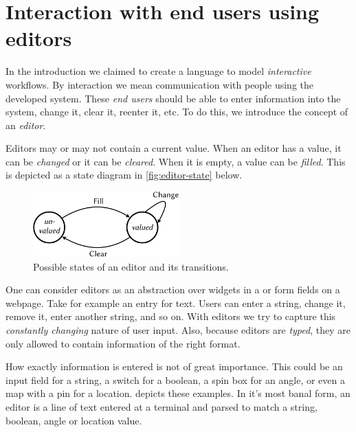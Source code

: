 
\section{Interaction with end users using editors}

In the introduction we claimed to create a language to model \emph{interactive} workflows.
By interaction we mean communication with people using the developed system.
These \emph{end users} should be able to enter information into the system,
change it, clear it, reenter it, etc.
To do this, we introduce the concept of an \emph{editor}.

Editors may or may not contain a current value.
When an editor has a value, it can be \emph{changed} or it can be \emph{cleared}.
When it is empty, a value can be \emph{filled}.
This is depicted as a state diagram in \autoref{fig:editor-state} below.

\begin{figure}
  \centering
  \includegraphics[width=0.5\textwidth]{figures/editor-state-crop.pdf}
  \caption{Possible states of an editor and its transitions.}
  \label{fig:editor-state}
\end{figure}

One can consider editors as an abstraction over widgets in a \GUI or form fields on a webpage.
Take for example an entry for text.
Users can enter a string, change it, remove it, enter another string, and so on.
With editors we try to capture this \emph{constantly changing} nature of user input.
Also, because editors are \emph{typed},
they are only allowed to contain information of the right format.

How exactly information is entered is not of great importance.
This could be an input field for a string,
a switch for a boolean,
a spin box for an angle,
or even a map with a pin for a location.
 depicts these examples.
In it's most banal form,
an editor is a line of text entered at a terminal and parsed to match a string, boolean, angle or location value.

